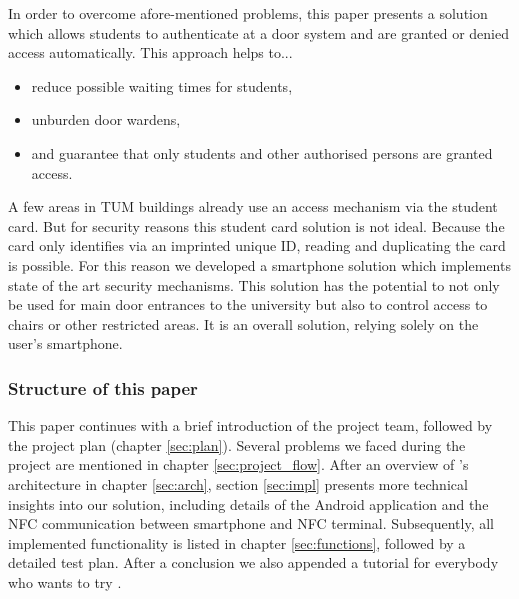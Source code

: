 In order to overcome afore-mentioned problems, this paper presents a solution which allows students to authenticate at a door system and are granted or denied access automatically. This approach helps to...

\begin{itemize}
\item reduce possible waiting times for students,
\item unburden door wardens,
\item and guarantee that only students and other authorised persons are granted access.
\end{itemize}

A few areas in TUM buildings already use an access mechanism via the student card.
But for security reasons this student card solution is not ideal.
Because the card only identifies via an imprinted unique ID, reading and duplicating the card is possible.
For this reason we developed a smartphone solution which implements state of the art security mechanisms.
This solution has the potential to not only be used for main door entrances to the university but also to control access to chairs or other restricted areas.
It is an overall solution, relying solely on the user's smartphone.
 
 \subsubsection*{Structure of this paper}

This paper continues with a brief introduction of the project team, followed by the project plan (chapter \ref{sec:plan}).
Several problems we faced during the project are mentioned in chapter \ref{sec:project_flow}.
After an overview of \app's architecture in chapter \ref{sec:arch}, section \ref{sec:impl} presents more technical insights into our solution, including details of the Android application and the NFC communication between smartphone and NFC terminal.
Subsequently, all implemented functionality is listed in chapter \ref{sec:functions}, followed by a detailed test plan.
After a conclusion we also appended a tutorial for everybody who wants to try \app.

